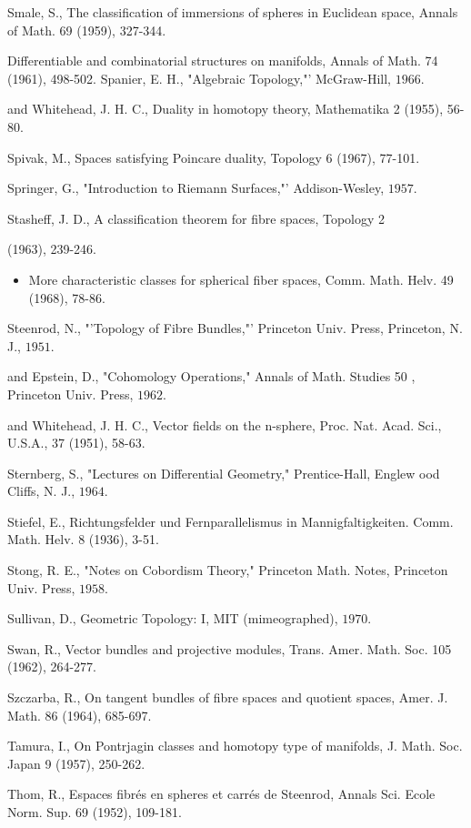 \documentclass[10pt]{article}
\begin{document}
Smale, S., The classification of immersions of spheres in Euclidean space, Annals of Math. 69 (1959), 327-344.

Differentiable and combinatorial structures on manifolds, Annals of Math. 74 (1961), 498-502. Spanier, E. H., "Algebraic Topology,"' McGraw-Hill, $1966 .$

and Whitehead, J. H. C., Duality in homotopy theory, Mathematika 2 (1955), 56-80.

Spivak, M., Spaces satisfying Poincare duality, Topology 6 (1967), 77-101.

Springer, G., "Introduction to Riemann Surfaces,"' Addison-Wesley, $1957 .$

Stasheff, J. D., A classification theorem for fibre spaces, Topology 2

(1963), 239-246.

\begin{itemize}
  \item More characteristic classes for spherical fiber spaces, Comm. Math. Helv. 49 (1968), 78-86.
\end{itemize}
Steenrod, N., "'Topology of Fibre Bundles,"' Princeton Univ. Press, Princeton, N. J., $1951 .$

and Epstein, D., "Cohomology Operations," Annals of Math. Studies 50 , Princeton Univ. Press, $1962 .$

and Whitehead, J. H. C., Vector fields on the n-sphere, Proc. Nat. Acad. Sci., U.S.A., 37 (1951), 58-63.

Sternberg, S., "Lectures on Differential Geometry," Prentice-Hall, Englew ood Cliffs, N. J., $1964 .$

Stiefel, E., Richtungsfelder und Fernparallelismus in Mannigfaltigkeiten. Comm. Math. Helv. 8 (1936), 3-51.

Stong, R. E., "Notes on Cobordism Theory," Princeton Math. Notes, Princeton Univ. Press, $1958 .$

Sullivan, D., Geometric Topology: I, MIT (mimeographed), $1970 .$

Swan, R., Vector bundles and projective modules, Trans. Amer. Math. Soc. 105 (1962), 264-277.

Szczarba, R., On tangent bundles of fibre spaces and quotient spaces, Amer. J. Math. 86 (1964), 685-697.

Tamura, I., On Pontrjagin classes and homotopy type of manifolds, J. Math. Soc. Japan 9 (1957), 250-262.

Thom, R., Espaces fibrés en spheres et carrés de Steenrod, Annals Sci. Ecole Norm. Sup. 69 (1952), 109-181.
\end{document}
